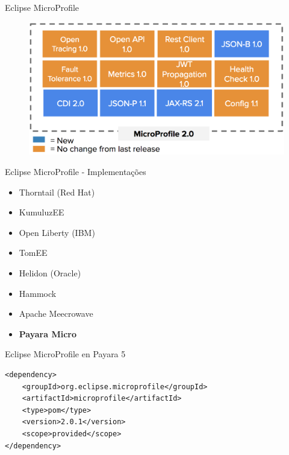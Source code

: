 \documentclass{beamer}
\begin{document}
\begin{frame}{Eclipse MicroProfile}
\begin{figure}
	\centering
	\includegraphics[width=\linewidth]{Images/mp5}
\end{figure}
\end{frame}


\begin{frame}{Eclipse MicroProfile - Implementações}
\begin{itemize}
	\item Thorntail (Red Hat)
	\item KumuluzEE
	\item Open Liberty (IBM)
	\item TomEE
	\item Helidon (Oracle)
	\item Hammock
	\item Apache Meecrowave
	\item \textbf{Payara Micro}
\end{itemize}
\end{frame}


\begin{frame}[fragile]{Eclipse MicroProfile en Payara 5}
\begin{lstlisting}
<dependency>
	<groupId>org.eclipse.microprofile</groupId>
	<artifactId>microprofile</artifactId>
	<type>pom</type>
	<version>2.0.1</version>
	<scope>provided</scope>
</dependency>
\end{lstlisting}
\end{frame}
\end{document}
